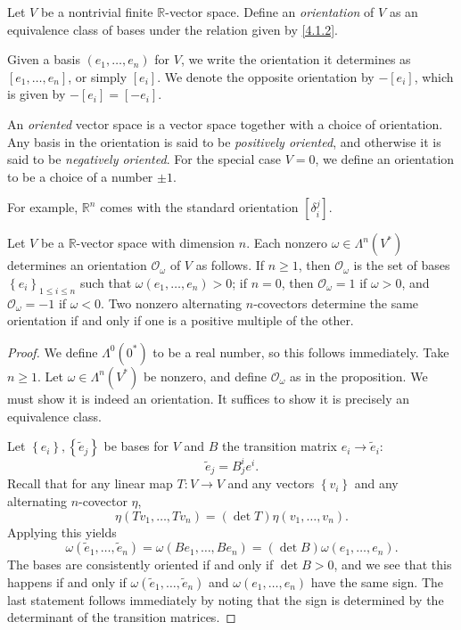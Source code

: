 \begin{definition}\label{4.1.3}
	Let $V$ be a nontrivial finite $\mathbb{R} $-vector space. Define an \emph{orientation} of $V$ as an equivalence class of bases under the relation given by \cref{4.1.2}.
\end{definition}
\begin{notation}\label{4.1.4}
	Given a basis $(e_1, \ldots ,e_n)$ for $V$, we write the orientation it determines as $[e_1, \ldots ,e_n]$, or simply $[e_i]$. We denote the opposite orientation by $-[e_i]$, which is given by $-[e_i]=[-e_i]$.
\end{notation}

An \emph{oriented} vector space is a vector space together with a choice of orientation. Any basis in the orientation is said to be \emph{positively oriented}, and otherwise it is said to be \emph{negatively oriented}. For the special case $V=0$, we define an orientation to be a choice of a number $\pm1$.

For example, $\mathbb{R} ^n$ comes with the standard orientation $[\delta _i^j]$.

\begin{proposition}\label{4.1.5}
	Let $V$ be a $\mathbb{R} $-vector space with dimension $n$. Each nonzero $\omega \in \Lambda ^n(V^*)$ determines an orientation $\mathcal{O} _\omega $ of $V$ as follows. If $n\geq 1$, then $\mathcal{O} _\omega $ is the set of bases $\left\{ e_i \right\}_{1\leq i\leq n}  $ such that $\omega (e_1, \ldots ,e_n)>0$; if $n=0$, then $\mathcal{O} _\omega =1$ if $\omega >0$, and $\mathcal{O}_\omega =-1$ if $\omega <0$. Two nonzero alternating $n$-covectors determine the same orientation if and only if one is a positive multiple of the other.
\end{proposition}
\begin{proof}
	We define $\Lambda ^0(0^*)$ to be a real number, so this follows immediately. Take $n\geq 1$. Let $\omega \in \Lambda ^n(V^*)$ be nonzero, and define $\mathcal{O} _\omega $ as in the proposition. We must show it is indeed an orientation. It suffices to show it is precisely an equivalence class.

	Let $\left\{ e_i \right\} ,\left\{ \widetilde{e} _j \right\} $ be bases for $V$ and $B$ the transition matrix $e_i \to \widetilde{e} _i$:
	\[
		\widetilde{e} _j= B_j^ie^i
	.\]
	Recall that for any linear map $T : V \to V$ and any vectors $\left\{ v_i \right\} $ and any alternating $n$-covector $\eta $,
	\[
		\eta (Tv_1, \ldots ,Tv_n)=(\det T)\eta (v_1, \ldots ,v_n)
	.\]
	Applying this yields
	\[
		\omega (\widetilde{e} _1, \ldots , \widetilde{e} _n)=\omega (Be_1, \ldots ,Be_n)=(\det B)\omega (e_1, \ldots ,e_n)
	.\]
	The bases are consistently oriented if and only if $\det B > 0$, and we see that this happens if and only if $\omega (\widetilde{e} _1, \ldots ,\widetilde{e} _n)$ and $\omega (e_1, \ldots ,e_n)$ have the same sign. The last statement follows immediately by noting that the sign is determined by the determinant of the transition matrices.
\end{proof}


